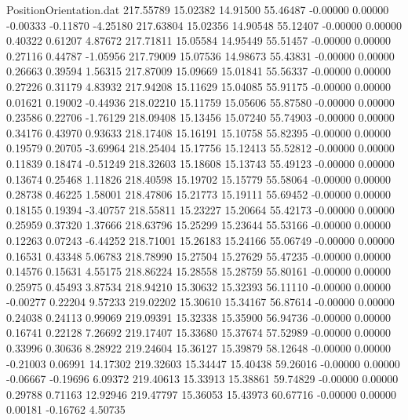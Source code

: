 \begin{filecontents}{PositionOrientation.dat}
 217.55789   15.02382   14.91500    55.46487   -0.00000    0.00000   -0.00333   -0.11870   -4.25180
 217.63804   15.02356   14.90548    55.12407   -0.00000    0.00000    0.40322    0.61207    4.87672
 217.71811   15.05584   14.95449    55.51457   -0.00000    0.00000    0.27116    0.44787   -1.05956
 217.79009   15.07536   14.98673    55.43831   -0.00000    0.00000    0.26663    0.39594    1.56315
 217.87009   15.09669   15.01841    55.56337   -0.00000    0.00000    0.27226    0.31179    4.83932
 217.94208   15.11629   15.04085    55.91175   -0.00000    0.00000    0.01621    0.19002   -0.44936
 218.02210   15.11759   15.05606    55.87580   -0.00000    0.00000    0.23586    0.22706   -1.76129
 218.09408   15.13456   15.07240    55.74903   -0.00000    0.00000    0.34176    0.43970    0.93633
 218.17408   15.16191   15.10758    55.82395   -0.00000    0.00000    0.19579    0.20705   -3.69964
 218.25404   15.17756   15.12413    55.52812   -0.00000    0.00000    0.11839    0.18474   -0.51249
 218.32603   15.18608   15.13743    55.49123   -0.00000    0.00000    0.13674    0.25468    1.11826
 218.40598   15.19702   15.15779    55.58064   -0.00000    0.00000    0.28738    0.46225    1.58001
 218.47806   15.21773   15.19111    55.69452   -0.00000    0.00000    0.18155    0.19394   -3.40757
 218.55811   15.23227   15.20664    55.42173   -0.00000    0.00000    0.25959    0.37320    1.37666
 218.63796   15.25299   15.23644    55.53166   -0.00000    0.00000    0.12263    0.07243   -6.44252
 218.71001   15.26183   15.24166    55.06749   -0.00000    0.00000    0.16531    0.43348    5.06783
 218.78990   15.27504   15.27629    55.47235   -0.00000    0.00000    0.14576    0.15631    4.55175
 218.86224   15.28558   15.28759    55.80161   -0.00000    0.00000    0.25975    0.45493    3.87534
 218.94210   15.30632   15.32393    56.11110   -0.00000    0.00000   -0.00277    0.22204    9.57233
 219.02202   15.30610   15.34167    56.87614   -0.00000    0.00000    0.24038    0.24113    0.99069
 219.09391   15.32338   15.35900    56.94736   -0.00000    0.00000    0.16741    0.22128    7.26692
 219.17407   15.33680   15.37674    57.52989   -0.00000    0.00000    0.33996    0.30636    8.28922
 219.24604   15.36127   15.39879    58.12648   -0.00000    0.00000   -0.21003    0.06991   14.17302
 219.32603   15.34447   15.40438    59.26016   -0.00000    0.00000   -0.06667   -0.19696    6.09372
 219.40613   15.33913   15.38861    59.74829   -0.00000    0.00000    0.29788    0.71163   12.92946
 219.47797   15.36053   15.43973    60.67716   -0.00000    0.00000    0.00181   -0.16762    4.50735

\end{filecontents}
